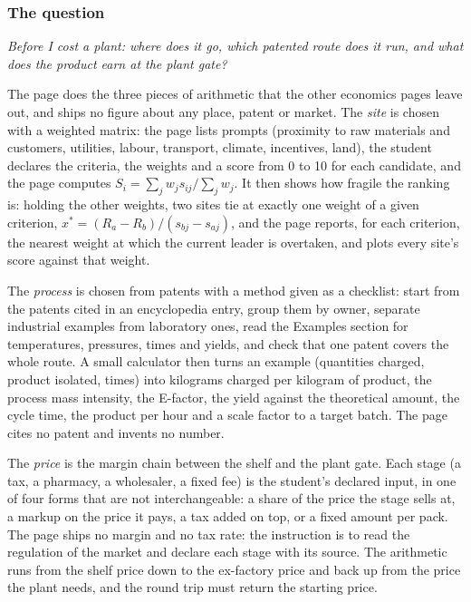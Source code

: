 \documentclass[11pt,a4paper]{article}
\begin{document}
\subsubsection*{The question}

\emph{Before I cost a plant: where does it go, which patented route does it
run, and what does the product earn at the plant gate?}

The page does the three pieces of arithmetic that the other economics pages
leave out, and ships no figure about any place, patent or market.  The
\emph{site} is chosen with a weighted matrix: the page lists prompts
(proximity to raw materials and customers, utilities, labour, transport,
climate, incentives, land), the student declares the criteria, the weights
and a score from 0 to 10 for each candidate, and the page computes
$S_i=\sum_j w_j s_{ij}/\sum_j w_j$.  It then shows how fragile the ranking
is: holding the other weights, two sites tie at exactly one weight of a given
criterion, $x^{*}=(R_a-R_b)/(s_{bj}-s_{aj})$, and the page reports, for each
criterion, the nearest weight at which the current leader is overtaken, and
plots every site's score against that weight.

The \emph{process} is chosen from patents with a method given as a checklist:
start from the patents cited in an encyclopedia entry, group them by owner,
separate industrial examples from laboratory ones, read the Examples section
for temperatures, pressures, times and yields, and check that one patent
covers the whole route.  A small calculator then turns an example (quantities
charged, product isolated, times) into kilograms charged per kilogram of
product, the process mass intensity, the E-factor, the yield against the
theoretical amount, the cycle time, the product per hour and a scale factor
to a target batch.  The page cites no patent and invents no number.

The \emph{price} is the margin chain between the shelf and the plant gate.
Each stage (a tax, a pharmacy, a wholesaler, a fixed fee) is the student's
declared input, in one of four forms that are not interchangeable: a share of
the price the stage sells at, a markup on the price it pays, a tax added on
top, or a fixed amount per pack.  The page ships no margin and no tax rate:
the instruction is to read the regulation of the market and declare each stage
with its source.  The arithmetic runs from the shelf price down to the
ex-factory price and back up from the price the plant needs, and the round
trip must return the starting price.
\end{document}
